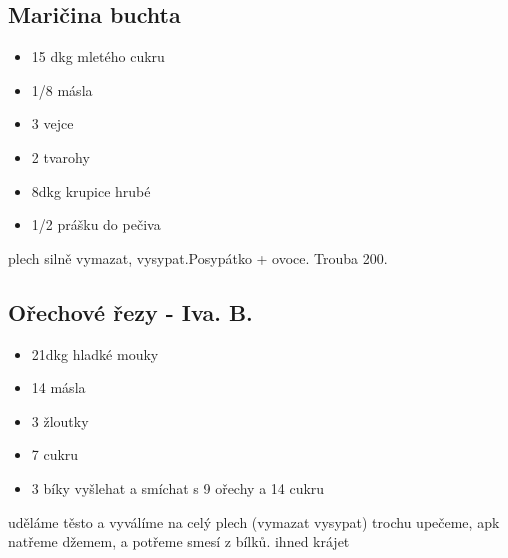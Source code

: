 \documentclass[10pt,a4paper]{article}
\newenvironment{myitemize}
{ \begin{itemize}
    \setlength{\itemsep}{0pt}
    \setlength{\parskip}{0pt}
    \setlength{\parsep}{0pt}     }
{ \end{itemize}                  }
\begin{document}
\subsection{Maričina buchta}
\begin{minipage}[t]{0,5\textwidth}
\begin{myitemize} 
\item 15 dkg mletého cukru
\item 1/8 másla
\item 3 vejce
\item 2 tvarohy
\item 8dkg krupice hrubé
\item 1/2 prášku do pečiva
\end{myitemize}
\end{minipage}
\begin{minipage}[t]{0,5\textwidth}
plech silně vymazat, vysypat.Posypátko + ovoce. Trouba 200.
\end{minipage}
\subsection{Ořechové řezy - Iva. B.}
\begin{minipage}[t]{0,5\textwidth}
\begin{myitemize} 
\item 21dkg hladké mouky
\item 14 másla
\item 3 žloutky
\item 7 cukru
\item3 bíky vyšlehat a smíchat s 9 ořechy a 14 cukru
\end{myitemize}
\end{minipage}
\begin{minipage}[t]{0,5\textwidth}
uděláme těsto a vyválíme na celý plech (vymazat vysypat) trochu upečeme, apk natřeme džemem, a potřeme smesí z bílků. ihned krájet
\end{minipage}
\end{document}
